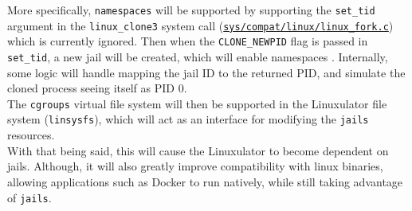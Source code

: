 \documentclass[12pt, dvipsnames, a4paper]{article}
\begin{document}
More specifically, \texttt{namespaces} will be supported by supporting
the \texttt{set\_tid} argument in the \texttt{linux\_clone3} system call (\href{https://github.com/freebsd/freebsd-src/blob/953efa5b200f060564a090ab71b3d7f614a35e3f/sys/compat/linux/linux_fork.c#L398}{\texttt{sys/compat/linux/linux\_fork.c}})
which is currently ignored. Then when the \texttt{CLONE\_NEWPID} flag is passed in
\texttt{set\_tid}, a new jail will be created, which will enable
namespaces \cite{clone}. Internally, some logic will handle mapping the jail ID to the
returned PID, and simulate the cloned process seeing itself as PID 0.\\

The \texttt{cgroups} virtual file system will then be supported in the
Linuxulator file system (\texttt{linsysfs}), which will act as an interface
for modifying the \texttt{jails} resources.\\

With that being said, this will cause the Linuxulator to become dependent on
jails. Although, it will also greatly improve compatibility with linux
binaries, allowing applications such as Docker to run natively, while still
taking advantage of \texttt{jails}.
\end{document}
